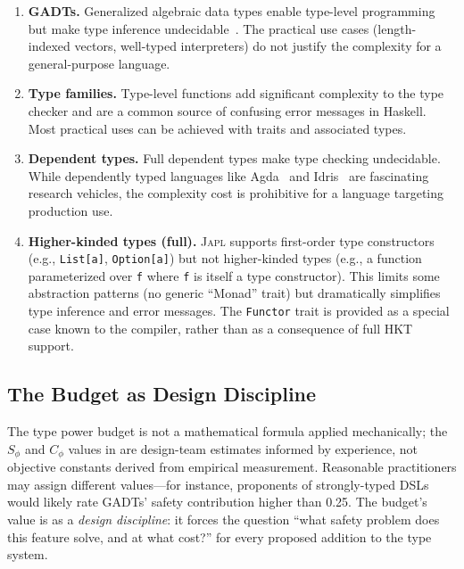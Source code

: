 \documentclass[11pt,twocolumn]{article}
\newcommand{\japl}{\textsc{Japl}}
\begin{document}
\begin{enumerate}[leftmargin=*]
\item \textbf{GADTs.} Generalized algebraic data types enable type-level programming but make type inference undecidable~\citep{jones2006gadts}. The practical use cases (length-indexed vectors, well-typed interpreters) do not justify the complexity for a general-purpose language.

\item \textbf{Type families.} Type-level functions add significant complexity to the type checker and are a common source of confusing error messages in Haskell. Most practical uses can be achieved with traits and associated types.

\item \textbf{Dependent types.} Full dependent types make type checking undecidable. While dependently typed languages like Agda~\citep{norell2007agda} and Idris~\citep{brady2013idris} are fascinating research vehicles, the complexity cost is prohibitive for a language targeting production use.

\item \textbf{Higher-kinded types (full).} \japl{} supports first-order type constructors (e.g., \texttt{List[a]}, \texttt{Option[a]}) but not higher-kinded types (e.g., a function parameterized over \texttt{f} where \texttt{f} is itself a type constructor). This limits some abstraction patterns (no generic ``Monad'' trait) but dramatically simplifies type inference and error messages.
The \texttt{Functor} trait is provided as a special case known to the compiler, rather than as a consequence of full HKT support.
\end{enumerate}

\subsection{The Budget as Design Discipline}

The type power budget is not a mathematical formula applied mechanically; the $S_\phi$ and $C_\phi$ values in  are design-team estimates informed by experience, not objective constants derived from empirical measurement.
Reasonable practitioners may assign different values---for instance, proponents of strongly-typed DSLs would likely rate GADTs' safety contribution higher than 0.25.
The budget's value is as a \emph{design discipline}: it forces the question ``what safety problem does this feature solve, and at what cost?'' for every proposed addition to the type system.
\end{document}
